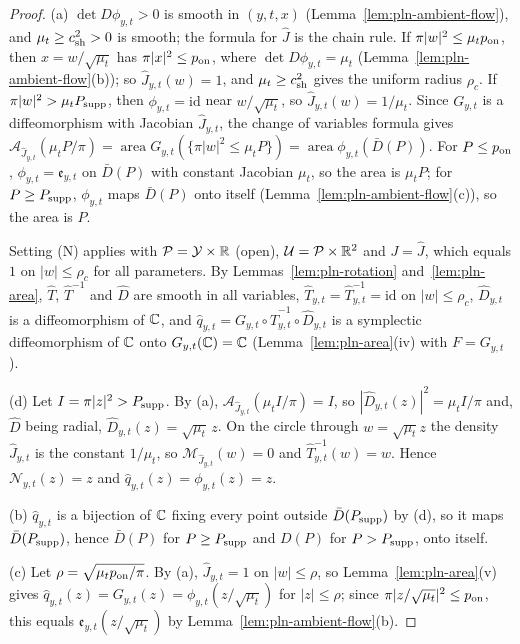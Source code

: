 \begin{proof}
(a) $\det D\phi_{y,t}>0$ is smooth in $(y,t,x)$ (Lemma~\ref{lem:pln-ambient-flow}), and $\mu_t\ge c_{\rm sh}^2>0$ is smooth; the
formula for $\hat J$ is the chain rule. If $\pi|w|^2\le\mu_tp_{\rm on}$, then $x=w/\sqrt{\mu_t}$ has $\pi|x|^2\le p_{\rm on}$, where
$\det D\phi_{y,t}=\mu_t$ (Lemma~\ref{lem:pln-ambient-flow}(b)); so $\hat J_{y,t}(w)=1$, and $\mu_t\ge c_{\rm sh}^2$ gives the uniform
radius $\rho_c$. If $\pi|w|^2>\mu_tP_{\rm supp}$, then $\phi_{y,t}=\mathrm{id}$ near $w/\sqrt{\mu_t}$, so $\hat J_{y,t}(w)=1/\mu_t$. Since
$G_{y,t}$ is a diffeomorphism with Jacobian $\hat J_{y,t}$, the change of variables formula gives
$\mathcal A_{\hat J_{y,t}}(\mu_tP/\pi)=\operatorname{area}G_{y,t}(\{\pi|w|^2\le\mu_tP\})=\operatorname{area}\phi_{y,t}(\bar D(P))$. For $P\le p_{\rm on}$,
$\phi_{y,t}=\mathfrak e_{y,t}$ on $\bar D(P)$ with constant Jacobian $\mu_t$, so the area is $\mu_tP$; for $P\ge P_{\rm supp}$, $\phi_{y,t}$
maps $\bar D(P)$ onto itself (Lemma~\ref{lem:pln-ambient-flow}(c)), so the area is $P$.

Setting (N) applies with $\mathcal P=\mathcal Y\times\mathbb{R}$ (open), $\mathcal U=\mathcal P\times\mathbb{R}^2$ and $J=\hat J$, which equals $1$ on
$|w|\le\rho_c$ for all parameters. By Lemmas~\ref{lem:pln-rotation} and~\ref{lem:pln-area}, $\hat T$, $\hat T^{-1}$ and $\hat D$ are
smooth in all variables, $\hat T_{y,t}=\hat T_{y,t}^{-1}=\mathrm{id}$ on $|w|\le\rho_c$, $\hat D_{y,t}$ is a diffeomorphism of $\mathbb{C}$, and
$\hat q_{y,t}=G_{y,t}\circ\hat T_{y,t}^{-1}\circ\hat D_{y,t}$ is a symplectic diffeomorphism of $\mathbb{C}$ onto $G_{y,t}(\mathbb{C})=\mathbb{C}$
(Lemma~\ref{lem:pln-area}(iv) with $F=G_{y,t}$).

(d) Let $I=\pi|z|^2>P_{\rm supp}$. By (a), $\mathcal A_{\hat J_{y,t}}(\mu_tI/\pi)=I$, so $|\hat D_{y,t}(z)|^2=\mu_tI/\pi$ and, $\hat D$ being
radial, $\hat D_{y,t}(z)=\sqrt{\mu_t}\,z$. On the circle through $w=\sqrt{\mu_t}z$ the density $\hat J_{y,t}$ is the constant $1/\mu_t$,
so $\mathcal M_{\hat J_{y,t}}(w)=0$ and $\hat T_{y,t}^{-1}(w)=w$. Hence $\mathcal N_{y,t}(z)=z$ and $\hat q_{y,t}(z)=\phi_{y,t}(z)=z$.

(b) $\hat q_{y,t}$ is a bijection of $\mathbb{C}$ fixing every point outside $\bar D(P_{\rm supp})$ by (d), so it maps $\bar D(P_{\rm supp})$, hence
$\bar D(P)$ for $P\ge P_{\rm supp}$ and $D(P)$ for $P>P_{\rm supp}$, onto itself.

(c) Let $\rho=\sqrt{\mu_tp_{\rm on}/\pi}$. By (a), $\hat J_{y,t}=1$ on $|w|\le\rho$, so Lemma~\ref{lem:pln-area}(v) gives
$\hat q_{y,t}(z)=G_{y,t}(z)=\phi_{y,t}(z/\sqrt{\mu_t})$ for $|z|\le\rho$; since $\pi|z/\sqrt{\mu_t}|^2\le p_{\rm on}$, this equals
$\mathfrak e_{y,t}(z/\sqrt{\mu_t})$ by Lemma~\ref{lem:pln-ambient-flow}(b).


\end{proof}
